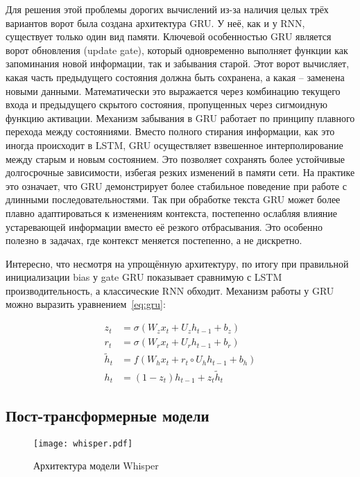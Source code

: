 Для решения этой проблемы дорогих вычислений из-за наличия целых трёх вариантов ворот была создана архитектура GRU.
У неё, как и у RNN, существует только один вид памяти.
Ключевой особенностью GRU является ворот обновления (update gate), который одновременно выполняет функции как запоминания новой информации, так и забывания старой.
Этот ворот вычисляет, какая часть предыдущего состояния должна быть сохранена, а какая -- заменена новыми данными.
Математически это выражается через комбинацию текущего входа и предыдущего скрытого состояния, пропущенных через сигмоидную функцию активации.
Механизм забывания в GRU работает по принципу плавного перехода между состояниями. Вместо полного стирания информации, как это иногда происходит в LSTM, GRU осуществляет взвешенное интерполирование между старым и новым состоянием. Это позволяет сохранять более устойчивые долгосрочные зависимости, избегая резких изменений в памяти сети.
На практике это означает, что GRU демонстрирует более стабильное поведение при работе с длинными последовательностями.
Так при обработке текста GRU может более плавно адаптироваться к изменениям контекста, постепенно ослабляя влияние устаревающей информации вместо её резкого отбрасывания.
Это особенно полезно в задачах, где контекст меняется постепенно, а не дискретно.

Интересно, что несмотря на упрощённую архитектуру, по итогу при правильной инициализации bias у gate GRU показывает сравнимую с LSTM производительность, а классические RNN обходит.
Механизм работы у GRU можно выразить уравнением~\ref{eq:gru}:

\begin{equation}
  \begin{aligned}
    z_t &= \sigma(W_z x_t + U_z h_{t-1} + b_z) \\
    r_t &= \sigma(W_r x_t + U_r h_{t-1} + b_r) \\
    \tilde{h}_t &= f(W_h x_t + r_t \circ U_h h_{t-1} + b_h) \\
    h_t &= (1 - z_t) h_{t-1} + z_t \tilde{h}_t
  \end{aligned}
  \label{eq:gru}
\end{equation}

\subsection{Пост-трансформерные модели}

\begin{figure}[!t]
  \centering
  \texttt{[image: whisper.pdf]}
  \caption{Архитектура модели Whisper}
  \label{fig:whisper}
\end{figure}

